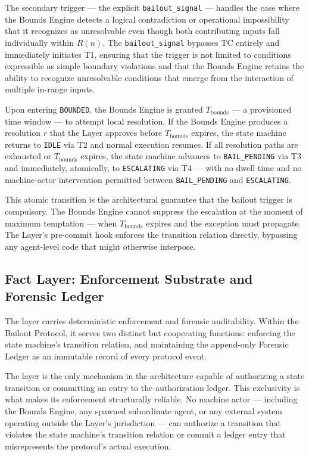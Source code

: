 The secondary trigger --- the explicit \texttt{bailout\_signal} --- handles the case where the Bounds Engine detects a logical contradiction or operational impossibility that it recognizes as unresolvable even though both contributing inputs fall individually within $R(n)$. The \texttt{bailout\_signal} bypasses TC entirely and immediately initiates T1, ensuring that the trigger is not limited to conditions expressible as simple boundary violations and that the Bounds Engine retains the ability to recognize unresolvable conditions that emerge from the interaction of multiple in-range inputs.

Upon entering \texttt{BOUNDED}, the Bounds Engine is granted $T_{\text{bounds}}$ --- a provisioned time window --- to attempt local resolution. If the Bounds Engine produces a resolution $r$ that the \fact{} Layer approves before $T_{\text{bounds}}$ expires, the state machine returns to \texttt{IDLE} via T2 and normal execution resumes. If all resolution paths are exhausted or $T_{\text{bounds}}$ expires, the state machine advances to \texttt{BAIL\_PENDING} via T3 and immediately, atomically, to \texttt{ESCALATING} via T4 --- with no dwell time and no machine-actor intervention permitted between \texttt{BAIL\_PENDING} and \texttt{ESCALATING}.

This atomic transition is the architectural guarantee that the bailout trigger is compulsory. The Bounds Engine cannot suppress the escalation at the moment of maximum temptation --- when $T_{\text{bounds}}$ expires and the exception must propagate. The \fact{} Layer's pre-commit hook enforces the transition relation directly, bypassing any agent-level code that might otherwise interpose.

\subsection{Fact Layer: Enforcement Substrate and Forensic Ledger}\label{sec:fact-layer}

The \fact{} layer carries deterministic enforcement and forensic auditability. Within the Bailout Protocol, it serves two distinct but cooperating functions: enforcing the state machine's transition relation, and maintaining the append-only Forensic Ledger as an immutable record of every protocol event.

The \fact{} layer is the only mechanism in the \bxthree{} architecture capable of authorizing a state transition or committing an entry to the authorization ledger. This exclusivity is what makes its enforcement structurally reliable. No machine actor --- including the Bounds Engine, any spawned subordinate agent, or any external system operating outside the \fact{} Layer's jurisdiction --- can authorize a transition that violates the state machine's transition relation or commit a ledger entry that misrepresents the protocol's actual execution.

